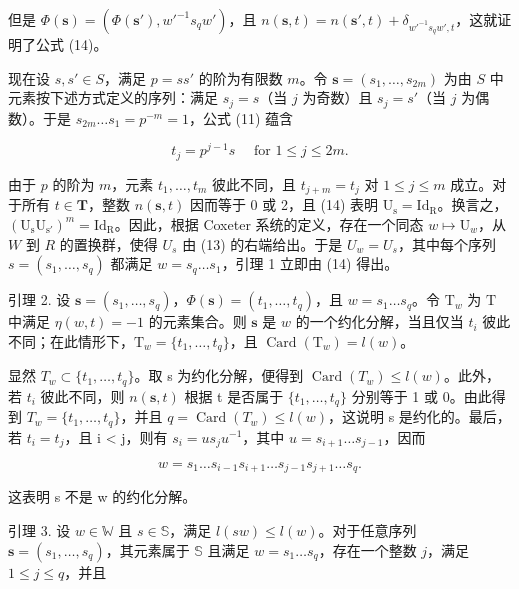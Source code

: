 但是 \(\Phi(\mathbf{s}) = (\Phi(\mathbf{s}'), w'^{-1}s_q w')\)，且 \(n(\mathbf{s}, t) = n(\mathbf{s}', t) + \delta_{w'^{-1}s_q w', t}\)，这就证明了公式 (14)。

现在设 \(s, s' \in S\)，满足 \(p = ss'\) 的阶为有限数 \(m\)。令 \(\mathbf{s} = (s_1, \ldots, s_{2m})\) 为由 \(S\) 中元素按下述方式定义的序列：满足 \(s_j = s\)（当 \(j\) 为奇数）且 \(s_j = s'\)（当 \(j\) 为偶数）。于是 \(s_{2m} \ldots s_1 = p^{-m} = 1\)，公式 (11) 蕴含

\[
t _ {j} = p ^ {j - 1} s \quad \text { for } 1 \leqslant j \leqslant 2 m.\tag{15}
\]

由于 \(p\) 的阶为 \(m\)，元素 \(t_1, \ldots, t_m\) 彼此不同，且 \(t_{j+m} = t_j\) 对 \(1 \leqslant j \leqslant m\) 成立。对于所有 \(t \in \mathbf{T}\)，整数 \(n(\mathbf{s}, t)\) 因而等于 0 或 2，且 (14) 表明 \(\mathrm{U_s} = \mathrm{Id_R}\)。换言之，\((\mathrm{U_sU_{s'}})^m = \mathrm{Id_R}\)。因此，根据 Coxeter 系统的定义，存在一个同态 \(w \mapsto \mathrm{U}_w\)，从 \(W\) 到 \(R\) 的置换群，使得 \(U_s\) 由 (13) 的右端给出。于是 \(U_w = U_s\)，其中每个序列 \(s = (s_1, \ldots, s_q)\) 都满足 \(w = s_q \ldots s_1\)，引理 1 立即由 (14) 得出。

引理 2. 设 \(\mathbf{s} = (s_1, \ldots, s_q)\)，\(\Phi(\mathbf{s}) = (t_1, \ldots, t_q)\)，且 \(w = s_1 \ldots s_q\)。令 \(\mathrm{T}_w\) 为 \(\mathrm{T}\) 中满足 \(\eta(w, t) = -1\) 的元素集合。则 \(\mathbf{s}\) 是 \(w\) 的一个约化分解，当且仅当 \(t_i\) 彼此不同；在此情形下，\(\mathrm{T}_w = \{t_1, \ldots, t_q\}\)，且 \(\operatorname{Card}(\mathrm{T}_w) = l(w)\)。

显然 \(T_{w} \subset \{t_{1}, \ldots, t_{q}\}\)。取 s 为约化分解，便得到 \(\operatorname{Card}(T_{w}) \leqslant l(w)\)。此外，若 \(t_{i}\) 彼此不同，则 \(n(\mathbf{s}, t)\) 根据 t 是否属于 \(\{t_{1}, \ldots, t_{q}\}\) 分别等于 1 或 0。由此得到 \(T_{w} = \{t_{1}, \ldots, t_{q}\}\)，并且 \(q = \operatorname{Card}(T_{w}) \leqslant l(w)\)，这说明 s 是约化的。最后，若 \(t_{i} = t_{j}\)，且 i \textless{} j，则有 \(s_{i} = us_{j}u^{-1}\)，其中 \(u = s_{i+1} \ldots s_{j-1}\)，因而

\[
w = s _ {1} \dots s _ {i - 1} s _ {i + 1} \dots s _ {j - 1} s _ {j + 1} \dots s _ {q}.
\]

这表明 s 不是 w 的约化分解。

引理 3. 设 \(w \in \mathbb{W}\) 且 \(s \in \mathbb{S}\)，满足 \(l(sw) \leqslant l(w)\)。对于任意序列 \(\mathbf{s} = (s_1, \ldots, s_q)\)，其元素属于 \(\mathbb{S}\) 且满足 \(w = s_1 \ldots s_q\)，存在一个整数 \(j\)，满足 \(1 \leqslant j \leqslant q\)，并且

